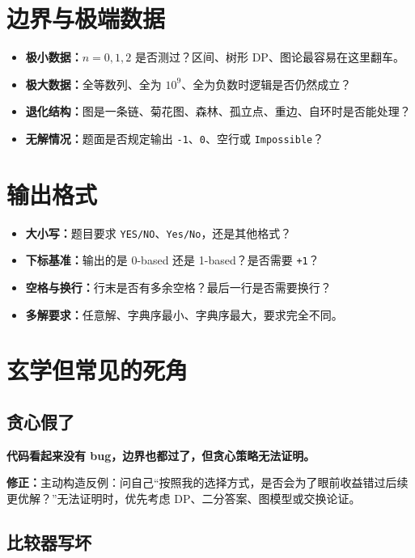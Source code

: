 \documentclass[UTF8,openany,oneside,zihao=-4]{ctexbook}
\newcommand{\risk}[1]{%
  \vspace{0.35em}
  \noindent\colorbox{softred}{%
    \parbox{\dimexpr\linewidth-2\fboxsep}{\textcolor{danger}{\textbf{#1}}}}%
  \vspace{0.35em}
}
\newcommand{\fix}[1]{%
  \vspace{0.35em}
  \noindent\colorbox{softgreen}{%
    \parbox{\dimexpr\linewidth-2\fboxsep}{\textbf{修正：}#1}}%
  \vspace{0.35em}
}
\newcommand{\term}[1]{\textbf{\textcolor{accenttwo}{#1}}}
\begin{document}
\section{边界与极端数据}

\begin{itemize}
  \item \term{极小数据：}$n=0,1,2$ 是否测过？区间、树形 DP、图论最容易在这里翻车。
  \item \term{极大数据：}全等数列、全为 $10^9$、全为负数时逻辑是否仍然成立？
  \item \term{退化结构：}图是一条链、菊花图、森林、孤立点、重边、自环时是否能处理？
  \item \term{无解情况：}题面是否规定输出 \lstinline!-1!、\lstinline!0!、空行或 \lstinline!Impossible!？
\end{itemize}

\section{输出格式}

\begin{itemize}
  \item \textbf{大小写：}题目要求 \lstinline!YES/NO!、\lstinline!Yes/No!，还是其他格式？
  \item \textbf{下标基准：}输出的是 0-based 还是 1-based？是否需要 \lstinline!+1!？
  \item \textbf{空格与换行：}行末是否有多余空格？最后一行是否需要换行？
  \item \textbf{多解要求：}任意解、字典序最小、字典序最大，要求完全不同。
\end{itemize}

\section{玄学但常见的死角}

\subsection{贪心假了}
\risk{代码看起来没有 bug，边界也都过了，但贪心策略无法证明。}

\fix{主动构造反例：问自己“按照我的选择方式，是否会为了眼前收益错过后续更优解？”无法证明时，优先考虑 DP、二分答案、图模型或交换论证。}

\subsection{比较器写坏}
\end{document}
